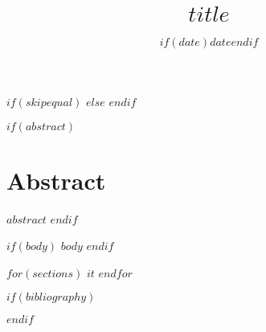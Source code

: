 \documentclass[%
  letterpaper,%
  $if(lang)$$lang$$else$english$endif$%
]{article}
\title{\vspace{-5ex} $title$}
\date{$if(date)$$date$$endif$}
\begin{document}
\maketitle

$if(skipequal)$
$else$
$endif$

$if(abstract)$
\section*{Abstract}
$abstract$
$endif$

$if(body)$
$body$
$endif$

$for(sections)$
$it$
$endfor$

$if(bibliography)$
\clearpage


$endif$


\end{document}
